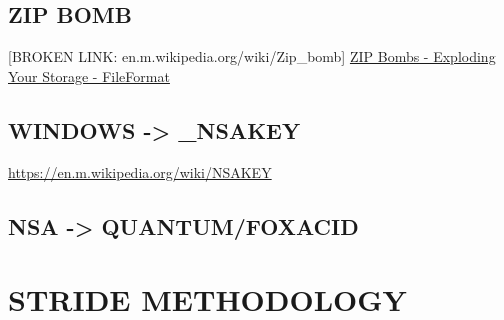 \documentclass[11pt]{article}
\begin{document}
\subsection{ZIP BOMB}
\label{sec:org7417e39}

[BROKEN LINK: en.m.wikipedia.org/wiki/Zip\_bomb]
\href{https://blog.fileformat.com/2021/10/09/zip-bombs-exploding-your-storage}{ZIP Bombs - Exploding Your Storage - FileFormat}

\subsection{WINDOWS -> \_NSAKEY}
\label{sec:org09dd516}

\url{https://en.m.wikipedia.org/wiki/NSAKEY}

\subsection{NSA -> QUANTUM/FOXACID}
\label{sec:org4fca4d7}
\section{STRIDE METHODOLOGY}
\label{sec:org1517631}
\end{document}
